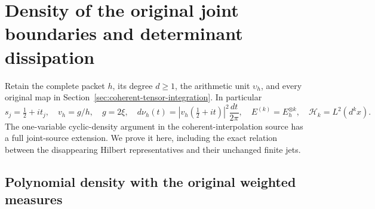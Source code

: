 \section{Density of the original joint boundaries and determinant dissipation}
\label{sec:joint-density-dissipation}

Retain the complete packet \(h\), its degree \(d\ge1\), the
arithmetic unit \(\upsilon_h\), and every original map in
Section~\ref{sec:coherent-tensor-integration}.  In particular
\[
 s_j=\tfrac12+it_j,\quad v_h=g/h,\quad g=2\xi,\quad
 d\nu_h(t)=|v_h(\tfrac12+it)|^2\frac{dt}{2\pi},\quad
 E^{(k)}=E_h^{\otimes k},\quad \mathcal H_k=L^2(d^kx).
 \tag{JD.1}
\]
The one-variable cyclic-density argument in the coherent-interpolation
source has a full joint-source extension.  We prove it here, including
the exact relation between the disappearing Hilbert representatives
and their unchanged finite jets.

\subsection{Polynomial density with the original weighted measures}

